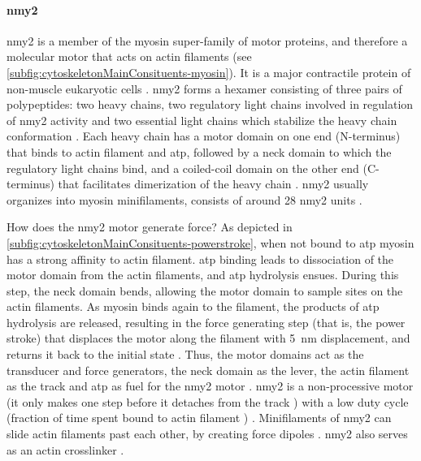 \paragraph{\acl{nmy2}}
\ac{nmy2} is a member of the myosin super-family of motor proteins, and therefore a molecular motor that acts on actin filaments (see \autoref{subfig:cytoskeletonMainConsituents-myosin}). It is a major contractile protein of non-muscle eukaryotic cells \citep{chaffey2003alberts,holmes2008myosin}. \ac{nmy2} forms a hexamer consisting of three pairs of polypeptides: two heavy chains, two regulatory light chains involved in regulation of \ac{nmy2} activity and two essential light chains which stabilize the heavy chain conformation \citep{holmes2008myosin,vicente2009non}. Each heavy chain has a motor domain on one end (N-terminus) that binds to actin filament and \ac{atp}, followed by a neck domain to which the regulatory light chains bind, and a coiled-coil domain on the other end (C-terminus) that facilitates dimerization of the heavy chain \citep{holmes2008myosin,vicente2009non,robert2019force}. \ac{nmy2} usually organizes into myosin minifilaments, consists of around \num{28} \ac{nmy2} units \citep{holmes2008myosin,vicente2009non}. 

How does the \ac{nmy2} motor generate force? As depicted in \autoref{subfig:cytoskeletonMainConsituents-powerstroke}, when not bound to \ac{atp} myosin has a strong affinity to actin filament. \ac{atp} binding leads to dissociation of the motor domain from the actin filaments, and \ac{atp} hydrolysis ensues. During this step, the neck domain bends, allowing the motor domain to sample sites on the actin filaments. As myosin binds again to the filament, the products of \ac{atp} hydrolysis are released, resulting in the force generating step (that is, the power stroke) that displaces the motor along the filament with \SI{5}{\nano\meter} displacement, and returns it back to the initial state \citep{de2004relating,sweeney2010structural,tyska2002myosin,robert2019force}. Thus, the motor domains act as the transducer and force generators, the neck domain as the lever, the actin filament as the track and \ac{atp} as fuel for the \ac{nmy2} motor \citep{robert2019force,hwang2009mechanical}. \ac{nmy2} is a non-processive motor (it only makes one step before it detaches from the track \citep{howard2002mechanics,hwang2009mechanical}) with a low duty cycle (fraction of time spent bound to actin filament \citep{howard2002mechanics,hwang2009mechanical}) \citep{kovacs2003functional,wang2003kinetic}. Minifilaments of \ac{nmy2} can slide actin filaments past each other, by creating force dipoles \citep{vicente2009non,niederman1975human,mahajan1996assembly}. \ac{nmy2} also serves as an actin crosslinker \citep{xu2001during,mizuno2007nonequilibrium,laevsky2003cross}.

